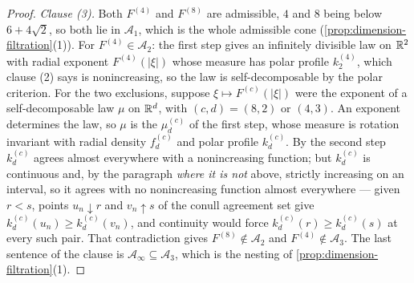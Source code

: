 \begin{proof}
\emph{Clause (3).} Both $F^{(4)}$ and $F^{(8)}$ are admissible, $4$ and $8$ being below
$6 + 4\sqrt2$, so both lie in $\mathcal{A}_1$, which is the whole admissible cone
(\ref{prop:dimension-filtration}(1)). For $F^{(4)} \in \mathcal{A}_2$: the first step gives an
infinitely divisible law on $\mathbb{R}^2$ with radial exponent $F^{(4)}(|\xi|)$ whose \Levy{} measure
has polar profile $k^{(4)}_2$, which clause (2) says is nonincreasing, so the law is
self-decomposable by the polar criterion. For the two exclusions, suppose
$\xi \mapsto F^{(c)}(|\xi|)$ were the exponent of a self-decomposable law $\mu$ on $\mathbb{R}^d$, with
$(c,d) = (8,2)$ or $(4,3)$. An exponent determines the law, so $\mu$ is the $\mu^{(c)}_d$ of the
first step, whose \Levy{} measure is rotation invariant with radial density $f^{(c)}_d$ and polar
profile $k^{(c)}_d$. By the second step $k^{(c)}_d$ agrees almost everywhere with a nonincreasing
function; but $k^{(c)}_d$ is continuous and, by the paragraph \emph{where it is not} above,
strictly increasing on an interval, so it agrees with no nonincreasing function almost everywhere
--- given $r < s$, points $u_n \downarrow r$ and $v_n \uparrow s$ of the conull agreement set give
$k^{(c)}_d(u_n) \ge k^{(c)}_d(v_n)$, and continuity would force $k^{(c)}_d(r) \ge k^{(c)}_d(s)$ at
every such pair. That contradiction gives $F^{(8)} \notin \mathcal{A}_2$ and
$F^{(4)} \notin \mathcal{A}_3$. The last sentence of the clause is
$\mathcal{A}_\infty \subseteq \mathcal{A}_3$, which is the nesting of
\ref{prop:dimension-filtration}(1).
\end{proof}

